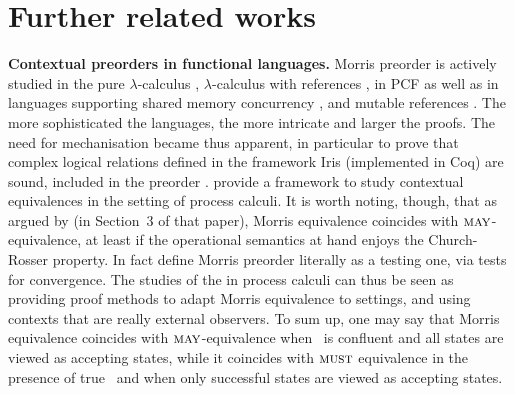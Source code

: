 \section{Further related works}
\label{sec:bisimulation}
\label{sec:detailed-related-works}



{\bfseries Contextual preorders in functional languages.}
Morris preorder is actively studied in
the pure $\lambda$-calculus \cite{DBLP:conf/rta/BreuvartMPR16,DBLP:journals/lmcs/BreuvartMR18,DBLP:journals/lmcs/IntrigilaMP19,DBLP:books/cp/BarendregtM22}, %
$\lambda$-calculus with references \cite{DBLP:conf/icalp/Prebet22,DBLP:conf/fossacs/HirschkoffJP23}, %
in PCF \cite{koutavas13} %
as well as in languages supporting shared memory concurrency \cite{DBLP:conf/popl/TuronTABD13}, and mutable references \cite{DBLP:journals/jfp/DreyerNB12}.
%
The more sophisticated the languages, the more intricate and larger the proofs.
The need for mechanisation became thus apparent, in particular to prove that
complex logical relations defined in the framework Iris
  (implemented in Coq) %
are sound, \ie included in the preorder \cite{DBLP:conf/popl/KrebbersTB17,DBLP:conf/lics/FruminKB18}.
\cite{DBLP:journals/jlap/AubertV22} provide a framework to study
contextual equivalences in the setting of process calculi.
It is worth noting, though, that as argued by
\cite{DBLP:journals/lisp/Boudol98} (in Section~$3$ of that paper),
Morris equivalence coincides with $\May$-equivalence,
at least if the operational semantics at hand enjoys the Church-Rosser
property. In fact \cite{DBLP:conf/caap/BoudolL96} define Morris
preorder literally as a testing one, via tests for convergence.
The studies of the \mustpreorder in process calculi can thus be seen
as providing proof methods to adapt Morris equivalence to
\nondeterministic settings, and using contexts that are really
external observers. To sum up, one may say that
  Morris equivalence coincides with $\May$-equivalence when
  \nondeterminism\ is confluent and all states are viewed as accepting states,
  while it coincides with $\operatorname{\textsc{must}}$ equivalence in the presence of true
  \nondeterminism\ and when only successful states are viewed as accepting states.

